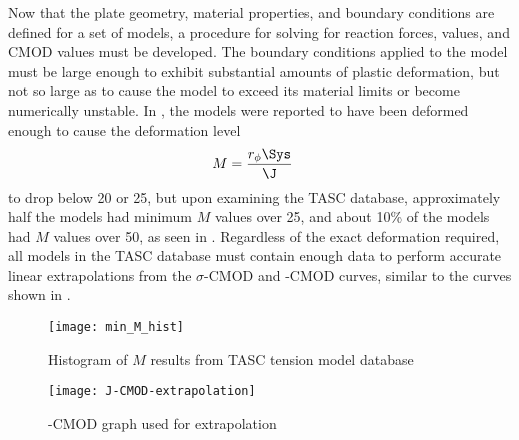 Now that the plate geometry, material properties, and boundary conditions are defined for a set of models, a procedure for solving for reaction forces, \J values, and CMOD values must be developed.
The boundary conditions applied to the model must be large enough to exhibit substantial amounts of plastic deformation, but not so large as to cause the model to exceed its material limits or become numerically unstable.
In \cite{allenwells2014}, the models were reported to have been deformed enough to cause the deformation level
\begin{align}
M &= \frac{r_{\phi} \Sys}{\J}
\end{align}
to drop below 20 or 25, but upon examining the TASC database, approximately half the models had minimum \(M\) values over 25, and about 10\% of the models had \(M\) values over 50, as seen in .
Regardless of the exact deformation required, all models in the TASC database must contain enough data to perform accurate linear extrapolations from the \(\sigma\)-CMOD and \J-CMOD curves, similar to the curves shown in .

\begin{figure}[tbp]
\centering
\texttt{[image: min\_M\_hist]}
\caption{\label{fig:min-M-hist} Histogram of \(M\) results from TASC tension model database}
\end{figure}

\begin{figure}[tbp]
\centering
\texttt{[image: J-CMOD-extrapolation]}
\caption{\label{fig:J-CMOD-extrapolation} \J-CMOD graph used for extrapolation \cite{allenwells2014}}
\end{figure}

